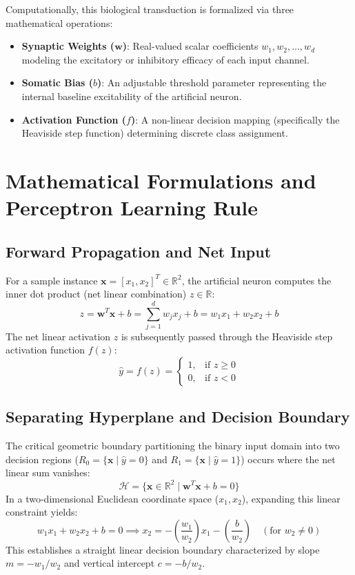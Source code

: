 \documentclass[12pt]{article}
\begin{document}
Computationally, this biological transduction is formalized via three mathematical operations:
\begin{itemize}
    \item \textbf{Synaptic Weights ($\mathbf{w}$)}: Real-valued scalar coefficients $w_1, w_2, \dots, w_d$ modeling the excitatory or inhibitory efficacy of each input channel.
    \item \textbf{Somatic Bias ($b$)}: An adjustable threshold parameter representing the internal baseline excitability of the artificial neuron.
    \item \textbf{Activation Function ($f$)}: A non-linear decision mapping (specifically the Heaviside step function) determining discrete class assignment.
\end{itemize}

\section{Mathematical Formulations and Perceptron Learning Rule}

\subsection{Forward Propagation and Net Input}
For a sample instance $\mathbf{x} = [x_1, x_2]^T \in \mathbb{R}^2$, the artificial neuron computes the inner dot product (net linear combination) $z \in \mathbb{R}$:
\begin{equation}
    z = \mathbf{w}^T \mathbf{x} + b = \sum_{j=1}^{d} w_j x_j + b = w_1 x_1 + w_2 x_2 + b
\end{equation}
The net linear activation $z$ is subsequently passed through the Heaviside step activation function $f(z)$:
\begin{equation}
    \hat{y} = f(z) = \begin{cases} 
        1, & \text{if } z \ge 0 \\ 
        0, & \text{if } z < 0 
    \end{cases}
\end{equation}

\subsection{Separating Hyperplane and Decision Boundary}
The critical geometric boundary partitioning the binary input domain into two decision regions ($R_0 = \{\mathbf{x} \mid \hat{y}=0\}$ and $R_1 = \{\mathbf{x} \mid \hat{y}=1\}$) occurs where the net linear sum vanishes:
\begin{equation}
    \mathcal{H} = \{\mathbf{x} \in \mathbb{R}^2 \mid \mathbf{w}^T \mathbf{x} + b = 0\}
\end{equation}
In a two-dimensional Euclidean coordinate space ($x_1, x_2$), expanding this linear constraint yields:
\begin{equation}
    w_1 x_1 + w_2 x_2 + b = 0 \implies x_2 = - \left( \frac{w_1}{w_2} \right) x_1 - \left( \frac{b}{w_2} \right) \quad (\text{for } w_2 \neq 0)
\end{equation}
This establishes a straight linear decision boundary characterized by slope $m = -w_1 / w_2$ and vertical intercept $c = -b / w_2$.
\end{document}
